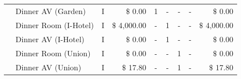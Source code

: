 \begin{table}[H]
{\begin{tabular}{|clcrccccr|}
     & Dinner AV (Garden)        & I                         & $\$$ 0.00                 &    1                      &        -                 &        -                  &        -                  & $\$$ 0.00                 \\
     & Dinner Room (I-Hotel)     & I                         & $\$$ 4,000.00             &     -                     &         1                &         -                 &         -                 & $\$$ 4,000.00             \\ 
     & Dinner AV (I-Hotel)       & I                         & $\$$ 0.00                 &      -                    &          1               &          -                &          -                & $\$$ 0.00                 \\
     & Dinner Room (Union)       & I                         & $\$$ 0.00                 &     -                     &         -                &         1                 &         -                 & $\$$ 0.00                 \\ 
     & Dinner AV (Union)         & I                         & $\$$ 17.80                &      -                    &          -               &        1                  &          -                & $\$$ 17.80                \\ \hline  
     

\end{tabular}}
\end{table}
